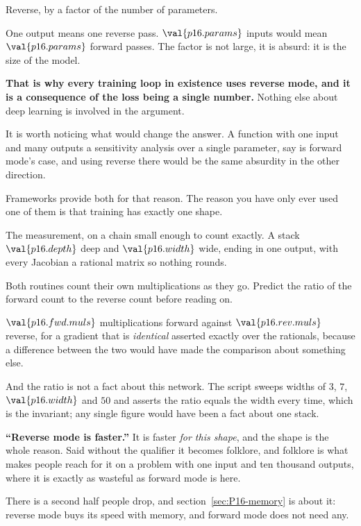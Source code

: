 \begin{fr}
\begin{ansblock}
Reverse, by a factor of the number of parameters.
\end{ansblock}

One output means one reverse pass. $\val{p16.params}$ inputs would mean
$\val{p16.params}$ forward passes. The factor is not large, it is absurd: it
is the size of the model.

\textbf{That is why every training loop in existence uses reverse mode, and it
is a consequence of the loss being a single number.} Nothing else about deep
learning is involved in the argument.

\begin{aibox}
It is worth noticing what would change the answer. A function with one input
and many outputs \dash{} a sensitivity analysis over a single parameter, say
\dash{} is forward mode's case, and using reverse there would be the same
absurdity in the other direction.

Frameworks provide both for that reason. The reason you have only ever used
one of them is that training has exactly one shape.
\end{aibox}
\end{fr}

\begin{fr}
The measurement, on a chain small enough to count exactly. A stack
$\val{p16.depth}$ deep and $\val{p16.width}$ wide, ending in one output, with
every Jacobian a rational matrix so nothing rounds.

Both routines count their own multiplications as they go. Predict the ratio of
the forward count to the reverse count before reading on.
\dotline
\nextframe
\end{fr}

\begin{fr}
$\val{p16.fwd.muls}$ multiplications forward against
$\val{p16.rev.muls}$ reverse, for a gradient that is \emph{identical} \dash{}
asserted exactly over the rationals, because a difference between the two
would have made the comparison about something else.

And the ratio is not a fact about this network. The script sweeps widths of
$3$, $7$, $\val{p16.width}$ and $50$ and asserts the ratio equals the width
every time, which is the invariant; any single figure would have been a fact
about one stack.

\begin{trapbox}
\textbf{\enquote{Reverse mode is faster.}} It is faster \emph{for this shape},
and the shape is the whole reason. Said without the qualifier it becomes
folklore, and folklore is what makes people reach for it on a problem with one
input and ten thousand outputs, where it is exactly as wasteful as forward
mode is here.

There is a second half people drop, and section~\ref{sec:P16-memory} is about
it: reverse mode
buys its speed with memory, and forward mode does not need any.
\end{trapbox}
\end{fr}

